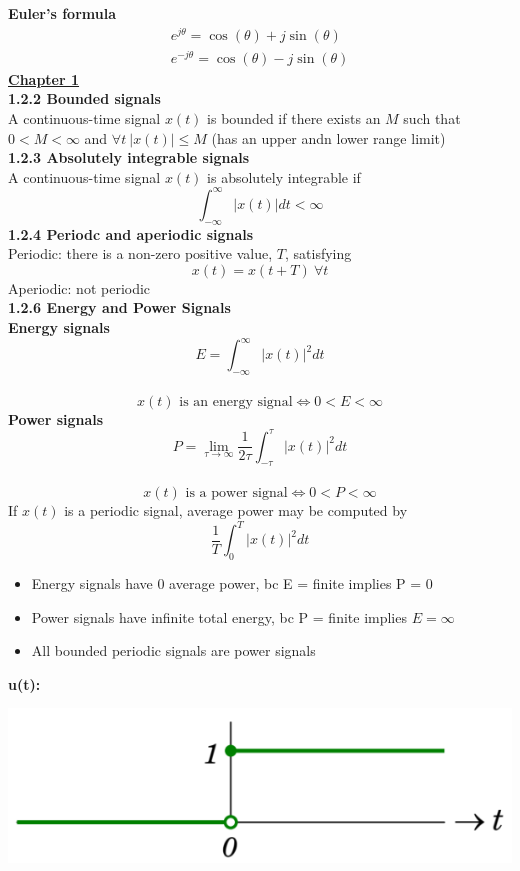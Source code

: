 \documentclass[6pt,landscape,a4paper]{extarticle}
\newenvironment{Figure}
  {\par\medskip\noindent\minipage{\linewidth}}
  {\endminipage\par\medskip}
\begin{document}
\fontsize{7}{9}\selectfont
\begin{multicols*}{5}
    \textbf{Euler's formula}
    \begin{align*}
        e^{j\theta}=\cos(\theta) + j\sin(\theta)\\
        e^{-j\theta}=\cos(\theta)-j\sin(\theta)
    \end{align*}
    \textbf{\uline{Chapter 1}}\\
    \textbf{1.2.2 Bounded signals}\\
    A continuous-time signal $x(t)$ is bounded if there exists an $M$ such that $0 < M < \infty$ and $\forall t \ |x(t)| \leq M$ (has an upper andn lower range limit)\\
    \textbf{1.2.3 Absolutely integrable signals}\\
    A continuous-time signal $x(t)$ is absolutely integrable if 
    \[
        \int_{-\infty}^{\infty}|x(t)| dt < \infty
    \]
    \textbf{1.2.4 Periodc and aperiodic signals}\\
    Periodic: there is a non-zero positive value, $T$, satisfying 
    \[
        x(t)=x(t+T) \ \forall t \tag{1.1}
    \]
    Aperiodic: not periodic\\
    \textbf{1.2.6 Energy and Power Signals}\\
    \textbf{Energy signals}
    \[
        E = \int_{-\infty}^{\infty}|x(t)|^2 dt \tag{1.3a}
    \]\\
    \[
        x(t) \text{ is an energy signal} \iff 0 < E < \infty \tag{1.3b}
    \]
    \textbf{Power signals}
    \[
        P = \lim_{\tau \to \infty}\frac{1}{2\tau}\int_{-\tau}^{\tau}|x(t)|^2dt \tag{1.4a}
    \]\\
    \[
        x(t) \text{ is a power signal} \iff 0 < P < \infty \tag{1.4b}
    \]
    If $x(t)$ is a periodic signal, average power may be computed by
    \[
        \frac{1}{T}\int_0^T|x(t)|^2 dt
    \]
    \begin{itemize}
        \item Energy signals have 0 average power, bc E = finite implies P = 0
        \item Power signals have infinite total energy, bc P = finite implies $E = \infty$
        \item All bounded periodic signals are power signals
    \end{itemize}
    \textbf{u(t):}
    \begin{Figure}
        \centering
        \includegraphics[width=0.8\linewidth]{images/unitStep.png}

\end{Figure}
\end{multicols*}
\end{document}
